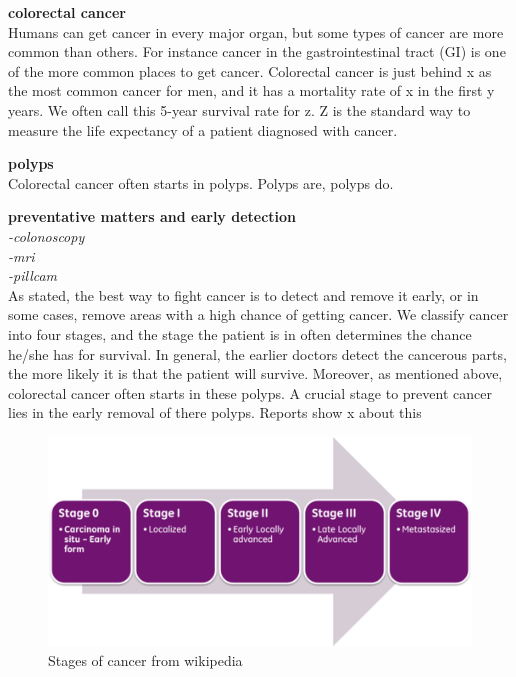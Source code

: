 \textbf{colorectal cancer}\\
Humans can get cancer in every major organ, but some types of cancer are more common than others.    
For instance cancer in the gastrointestinal tract (GI) is one of the more common places to get cancer. Colorectal cancer is just behind x as the most common cancer for men, and it has a mortality rate of x in the first y years. %
We often call this 5-year survival rate for z. Z is the standard way to measure the life expectancy of a patient diagnosed with cancer. 
    

\textbf{polyps}\\
Colorectal cancer often starts in polyps. 
Polyps are, polyps do.
    
\textbf{preventative matters and early detection}\\
    \textit{-colonoscopy\\ 
        -mri\\
        -pillcam\\}
    As stated, the best way to fight cancer is to detect and remove it early, or in some cases, remove areas with a high chance of getting cancer.
    We classify cancer into four stages, and the stage the patient is in often determines the chance he/she has for survival. 
    In general, the earlier doctors detect the cancerous parts, the more likely it is that the patient will survive. 
    Moreover, as mentioned above, colorectal cancer often starts in these polyps. A crucial stage to prevent cancer lies in the 
    early removal of there polyps.
    Reports show x about this %
    
    \begin{figure}
        \centering
        \includegraphics[scale=0.05]{introduction/figures/Cancer_stages.png}
        \caption{Stages of cancer from wikipedia} 
    \end{figure}

